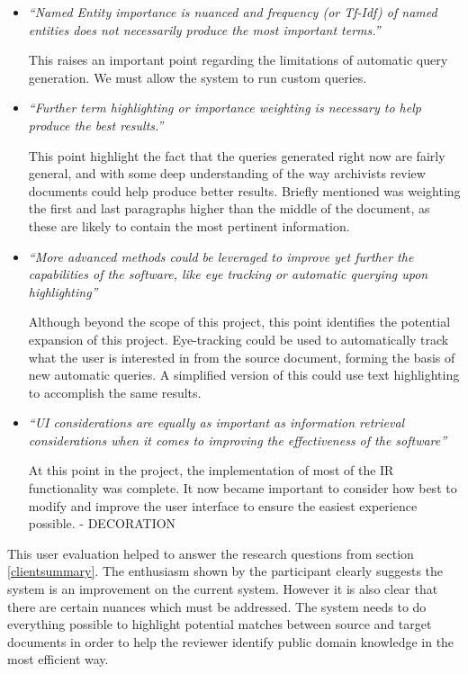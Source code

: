 \documentclass{l4proj}
\begin{document}
\begin{itemize}
\item \textit{``Named Entity importance is nuanced and frequency (or Tf-Idf) of named entities does not necessarily produce the most important terms.''}
\par
This raises an important point regarding the limitations of automatic query generation. We must allow the system to run custom queries.
\item \textit{``Further term highlighting or importance weighting is necessary to help produce the best results.''}
\par
This point highlight the fact that the queries generated right now are fairly general, and with some deep understanding of the way archivists review documents could help produce better results. Briefly mentioned was weighting the first and last paragraphs higher than the middle of the document, as these are likely to contain the most pertinent information.
\item \textit{``More advanced methods could be leveraged to improve yet further the capabilities of the software, like eye tracking or automatic querying upon highlighting''}
\par
Although beyond the scope of this project, this point identifies the potential expansion of this project. Eye-tracking could be used to automatically track what the user is interested in from the source document, forming the basis of new automatic queries. A simplified version of this could use text highlighting to accomplish the same results.
\item \textit{``UI considerations are equally as important as information retrieval considerations when it comes to improving the effectiveness of the software''}
\par
At this point in the project, the implementation of most of the IR functionality was complete. It now became important to consider how best to modify and improve the user interface to ensure the easiest experience possible. - DECORATION
\end{itemize}
This user evaluation helped to answer the research questions from section \ref{clientsummary}. The enthusiasm shown by the participant clearly suggests the system is an improvement on the current system. However it is also clear that there are certain nuances which must be addressed.
The system needs to do everything possible to highlight potential matches between source and target documents in order to help the reviewer identify public domain knowledge in the most efficient way.
\end{document}
